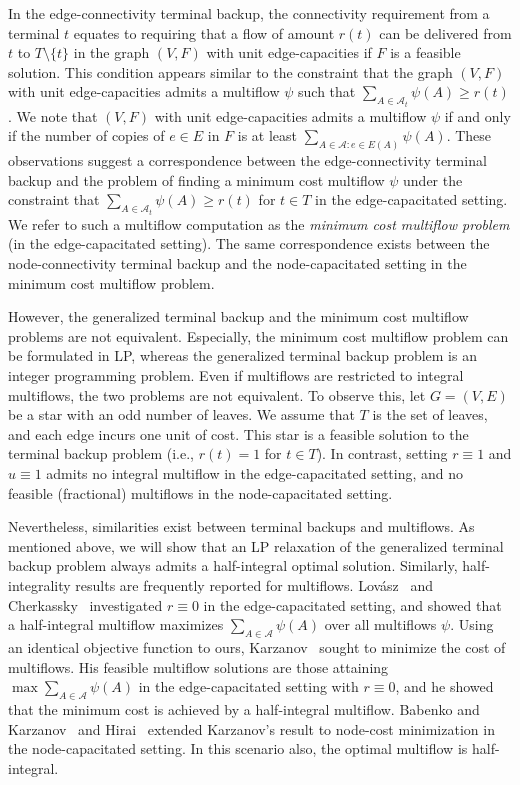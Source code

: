 \documentclass{article}
\newcommand{\Afam}{\mathcal{A}}
\begin{document}
In the edge-connectivity terminal backup, 
the connectivity requirement from a terminal $t$ equates to requiring that
a flow of amount $r(t)$ can be delivered from $t$ to $T\setminus \{t\}$
in the graph $(V,F)$ with unit edge-capacities if $F$ is a feasible solution.
This condition appears similar to the constraint that 
the graph $(V,F)$ with unit edge-capacities
admits a multiflow $\psi$
such that $\sum_{A \in \Afam_t}\psi(A) \geq r(t)$.
We note that $(V,F)$ with unit edge-capacities admits a multiflow $\psi$
if and only if
the number of copies of $e \in E$ in $F$ is at least $\sum_{A \in \Afam \colon e \in E(A)}\psi(A)$.
These observations suggest a correspondence between the edge-connectivity terminal backup
and the problem of finding a minimum cost multiflow $\psi$
under the constraint that 
$\sum_{A \in \Afam_t}\psi(A) \geq r(t)$ for $t \in T$ in the edge-capacitated setting.
We refer to such a multiflow computation as the \emph{minimum cost multiflow problem}
(in the edge-capacitated setting).
The same correspondence exists between
the node-connectivity terminal backup and the 
node-capacitated setting in the minimum cost multiflow problem.

However,
the generalized terminal backup and the minimum cost multiflow problems are not equivalent.
Especially, the minimum cost multiflow problem can be formulated in LP, whereas 
the generalized terminal backup problem is an integer programming problem.
Even if multiflows are restricted to integral multiflows, 
the two problems are not equivalent.
To observe this, let $G=(V,E)$ be a star with an odd number of leaves. 
We assume that $T$ is the set of leaves,
and each edge incurs one unit of cost.
This star is a feasible solution 
to the terminal backup problem (i.e., $r(t)=1$ for $t \in T$).
In contrast, setting $r\equiv 1$ and $u\equiv 1$
admits no integral multiflow in the edge-capacitated setting, and
no feasible (fractional) multiflows in the node-capacitated setting.

Nevertheless,
similarities exist between terminal backups and multiflows.
As mentioned above, we will show that an LP relaxation of the generalized terminal backup problem
always admits a half-integral optimal solution.
Similarly, half-integrality results are frequently reported for multiflows.
Lov\'asz~\cite{Lovasz76} and Cherkassky~\cite{Cherkasskky77} 
investigated $r \equiv 0$ in the edge-capacitated setting,
and showed that a half-integral multiflow maximizes $\sum_{A \in \Afam}\psi(A)$ over all 
multiflows $\psi$. Using an identical objective function to ours,
Karzanov~\cite{Karzanov94,Karzanov79} sought to
minimize the cost of multiflows.
His feasible multiflow solutions are those attaining $\max \sum_{A \in \Afam}\psi(A)$
in the edge-capacitated setting with $r \equiv 0$,
and he showed that the minimum cost is achieved by a half-integral multiflow.
Babenko and Karzanov~\cite{BabenkoK12} and Hirai~\cite{Hirai13} extended 
Karzanov's result to node-cost minimization in the node-capacitated setting.
In this scenario also, the optimal multiflow is half-integral.
\end{document}
